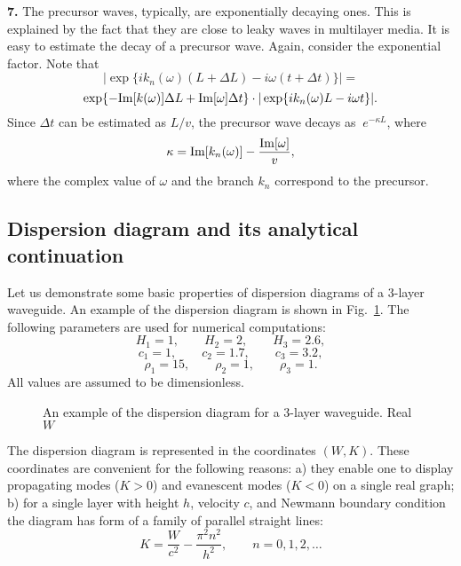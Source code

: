 \documentclass[12pt]{article}
\begin{document}
{\bf 7.}
The precursor waves, typically, are exponentially decaying ones. 
This is explained by the fact that they are close to leaky waves in multilayer media. 
It is easy to estimate the decay of a precursor wave. Again, consider the exponential factor. 
Note that   
\[
|\exp \{ i k_n (\omega) (L + \Delta L) - i \omega (t + \Delta t) \}| = 
\]
\[
\exp \{ - {\rm Im} [k (\omega)] \Delta L + {\rm Im} [\omega] \Delta t\}
\cdot
|\exp \{ i k_n (\omega) L  - i \omega t \}|.
\]
Since $\Delta t$ can be estimated as $L / v$, the precursor wave decays as $~e^{-\kappa L}$,
where 
\begin{equation}
\kappa = {\rm Im}[k_n(\omega)] - \frac{{\rm Im}[\omega]}{v},
\label{eq0208}
\end{equation}
where the complex value of $\omega$ and the branch $k_n$ correspond to the precursor.  

\subsection{Dispersion diagram and its analytical continuation}
\label{sec_overview}

Let us demonstrate some basic properties of dispersion diagrams of a 3-layer waveguide.
An example of the dispersion diagram is shown in Fig.~\ref{fig04}. The following parameters 
are used for numerical computations: 
\[
H_1 = 1, 
\qquad 
H_2 = 2, 
\qquad 
H_3 = 2.6, 
\]
\[
c_1 = 1, 
\qquad 
c_2 = 1.7 , 
\qquad 
c_3 = 3.2, 
\]
\[
\rho_1 = 15, 
\qquad 
\rho_2 =  1, 
\qquad 
\rho_3 =  1 .
\]
All values are assumed to be dimensionless. 

\begin{figure}[ht]
\centerline{}
\caption{An example of the dispersion diagram for a 3-layer waveguide. Real $W$} 
\label{fig04}
\end{figure}
 
The dispersion diagram is represented in the coordinates $(W,K)$. These coordinates are convenient for the following reasons: a) they enable one to display propagating modes ($K > 0$)
and evanescent modes ($K < 0$) on a single real graph; b) for a single layer with height $h$, 
velocity $c$, and Newmann boundary condition the diagram has form of a family of parallel 
straight lines: 
\begin{equation}
K = \frac{W}{c^2} - \frac{\pi^2 n^2}{h^2}, 
\qquad
n = 0 , 1 , 2 ,\dots  
\label{eq0209}
\end{equation}
\end{document}
